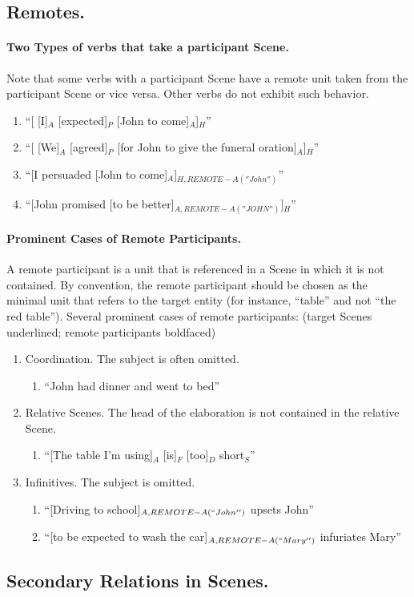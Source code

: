 \documentclass[11pt]{article}
\newcommand{\be}{\begin{enumerate}}
\newcommand{\ee}{\end{enumerate}}
\begin{document}
\subsection{Remotes.}

\paragraph{Two Types of verbs that take a participant Scene.} Note that some verbs with a participant Scene have a remote unit taken from the participant Scene or vice versa. Other verbs do not exhibit such behavior.
\be
\item
``[ [I]$_A$ [expected]$_P$ [John to come]$_A$]$_H$''
\item
``[ [We]$_A$ [agreed]$_P$ [for John to give the funeral oration]$_A$]$_H$''
\item
``[I persuaded [John to come]$_A$]$_{H,REMOTE-A(''John'')}$''
\item
``[John promised [to be better]$_{A,REMOTE-A(''JOHN'')}$]$_H$''
\ee

\paragraph{Prominent Cases of Remote Participants.} A remote participant is a unit that is referenced in a Scene in which it is not contained. By convention, the remote participant should be chosen as the minimal unit that refers to the target entity (for instance, ``table'' and not ``the red table''). Several prominent cases of remote participants: (target Scenes underlined; remote participants boldfaced)
\be
\item
Coordination. The subject is often omitted.
\be \item ``John had dinner and went to bed'' \ee
\item
Relative Scenes. The head of the elaboration is not contained in the relative Scene.
\be \item ``[The table I'm using]$_A$ [is]$_F$ [too]$_D$ short$_S$'' \ee
\item
Infinitives. The subject is omitted.
\be \item ``[Driving to school]$_{A,REMOTE-A(``John'')}$ upsets John''
\item ``[to be expected to wash the car]$_{A,REMOTE-A(``Mary'')}$ infuriates Mary''
\ee
\ee

\subsection{Secondary Relations in Scenes.}
\end{document}
